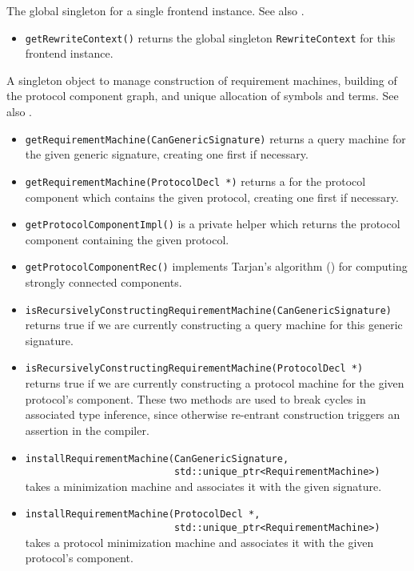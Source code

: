 \documentclass[../generics]{subfiles}
\begin{document}
The global singleton for a single frontend instance. See also .
\begin{itemize}
\item \texttt{getRewriteContext()} returns the global singleton \texttt{RewriteContext} for this frontend instance.
\end{itemize}

A singleton object to manage construction of requirement machines, building of the protocol component graph, and unique allocation of symbols and terms. See also .
\begin{itemize}
\item \texttt{getRequirementMachine(CanGenericSignature)} returns a query machine for the given generic signature, creating one first if necessary.
\item \texttt{getRequirementMachine(ProtocolDecl *)} returns a  for the protocol component which contains the given protocol, creating one first if necessary.
\item \texttt{getProtocolComponentImpl()} is a private helper which returns the protocol component containing the given protocol.
\item \texttt{getProtocolComponentRec()} implements Tarjan's algorithm () for computing strongly connected components.
\item \texttt{isRecursivelyConstructingRequirementMachine(CanGenericSignature)}\\
returns true if we are currently constructing a query machine for this generic signature.
\item \texttt{isRecursivelyConstructingRequirementMachine(ProtocolDecl *)}\\
returns true if we are currently constructing a protocol machine for the given protocol's component. These two methods are used to break cycles in associated type inference, since otherwise re-entrant construction triggers an assertion in the compiler.
\item
\verb|installRequirementMachine(CanGenericSignature,|\\
\verb|                          std::unique_ptr<RequirementMachine>)|\\
takes a minimization machine and associates it with the given signature.
\item
\verb|installRequirementMachine(ProtocolDecl *,|\\
\verb|                          std::unique_ptr<RequirementMachine>)|\\
takes a protocol minimization machine and associates it with the given protocol's component.
\end{itemize}
\end{document}
